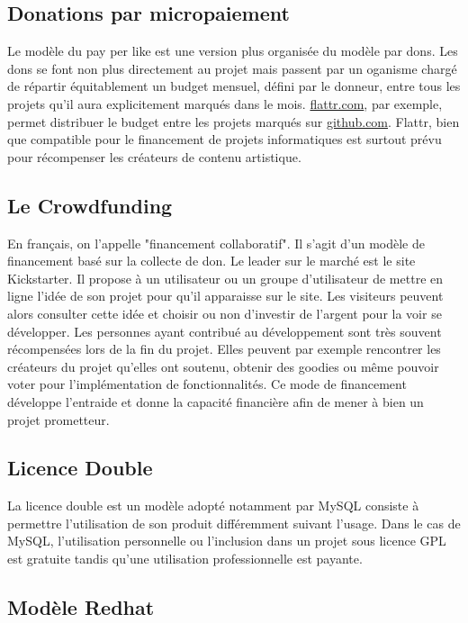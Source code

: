     \subsection{Donations par micropaiement}

Le modèle du pay per like est une version plus organisée du modèle par dons.
Les dons se font non plus directement au projet mais passent par un oganisme
chargé de répartir équitablement un budget mensuel, défini par le donneur,
entre tous les projets qu'il aura explicitement marqués dans le mois.
\url{flattr.com}, par exemple, permet distribuer le budget entre les projets
marqués sur \url{github.com}. Flattr, bien que compatible pour le financement
de projets informatiques est surtout prévu pour récompenser les créateurs de
contenu artistique.

    \subsection{Le Crowdfunding}

En français, on l'appelle "financement collaboratif". Il s'agit d'un modèle de
financement basé sur la collecte de don. Le leader sur le marché est le site
Kickstarter. Il propose à un utilisateur ou un groupe d'utilisateur de mettre
en ligne l'idée de son projet pour qu'il apparaisse sur le site. Les visiteurs
peuvent alors consulter cette idée et choisir ou non d'investir de l'argent
pour la voir se développer. Les personnes ayant contribué au développement sont
très souvent récompensées lors de la fin du projet.  Elles peuvent par exemple
rencontrer les créateurs du projet qu'elles ont soutenu, obtenir des
goodies ou même pouvoir voter pour l'implémentation de
fonctionnalités.  Ce mode de financement développe l'entraide et donne la
capacité financière afin de mener à bien un projet prometteur.

    \subsection{Licence Double}

La licence double est un modèle adopté notamment par MySQL consiste à permettre
l'utilisation de son produit différemment suivant l'usage. Dans le cas de
MySQL, l'utilisation personnelle ou l'inclusion dans un projet sous licence GPL
est gratuite tandis qu'une utilisation professionnelle est payante.

    \subsection{Modèle Redhat}

